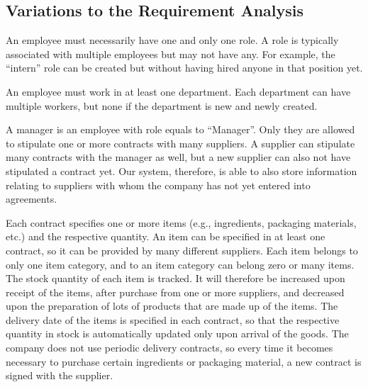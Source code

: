 \subsection{Variations to the Requirement Analysis}

An employee must necessarily have one and only one role. A role is typically associated with multiple employees but may not have any. For example, the ``intern'' role can be created but without having hired anyone in that position yet.

An employee must work in at least one department. Each department can have multiple workers, but none if the department is new and newly created.

A manager is an employee with role equals to ``Manager''. Only they are allowed  to stipulate one or more contracts with many suppliers. A supplier can stipulate many contracts with the manager as well, but a new supplier can also not have stipulated a contract yet. Our system, therefore, is able to also store information relating to suppliers with whom the company has not yet entered into agreements.

Each contract specifies one or more items (e.g., ingredients, packaging materials, etc.) and the respective quantity. An item can be specified in at least one contract, so it can be provided by many different suppliers. Each item belongs to only one item category, and to an item category can belong zero or many items. The stock quantity of each item is tracked. It will therefore be increased upon receipt of the items, after purchase from one or more suppliers, and decreased upon the preparation of lots of products that are made up of the items. The delivery date of the items is specified in each contract, so that the respective quantity in stock is automatically updated only upon arrival of the goods. The company does not use periodic delivery contracts, so every time it becomes necessary to purchase certain ingredients or packaging material, a new contract is signed with the supplier.

